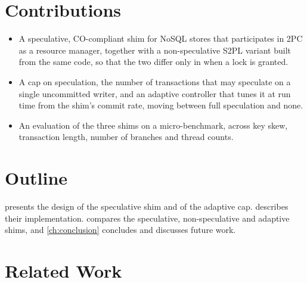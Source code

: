 \section{Contributions}
\label{sec:contributions}

\begin{itemize}[leftmargin=*]
  \item A speculative, CO-compliant shim for NoSQL stores that participates in 2PC as a resource
        manager, together with a non-speculative S2PL variant built from the same code, so that
        the two differ only in when a lock is granted.
  \item A cap on speculation, the number of transactions that may speculate on a single
        uncommitted writer, and an adaptive controller that tunes it at run time from the shim's
        commit rate, moving between full speculation and none.
  \item An evaluation of the three shims on a micro-benchmark, across key skew, transaction length,
        number of branches and thread counts.
\end{itemize}

\section{Outline}
\label{sec:outline}

 presents the design of the speculative shim and of the adaptive cap.
 describes their implementation.  compares the
speculative, non-speculative and adaptive shims, and \cref{ch:conclusion} concludes and discusses
future work.

\section{Related Work}
\label{sec:related-work}
